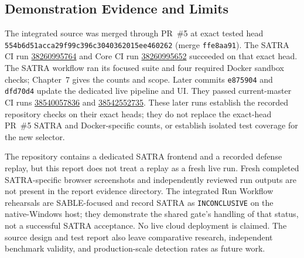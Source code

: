 \subsection{Demonstration Evidence and Limits}
The integrated source was merged through PR~\#5 at exact tested head \texttt{554b6d51ac\allowbreak{}ca29f99c39\allowbreak{}6c30403620\allowbreak{}15ee460262} (merge \texttt{ffe8aa91}). The SATRA CI run \href{https://github.com/SheharyarAli-Dev/Working-POC/actions/runs/38260995764}{38260995764} and Core CI run \href{https://github.com/SheharyarAli-Dev/Working-POC/actions/runs/38260995652}{38260995652} succeeded on that exact head. The SATRA workflow ran its focused suite and four required Docker sandbox checks; Chapter~7 gives the counts and scope. Later commits \texttt{e875904} and \texttt{dfd70d4} update the dedicated live pipeline and UI. They passed current-master CI runs \href{https://github.com/SheharyarAli-Dev/Working-POC/actions/runs/38540057836}{38540057836} and \href{https://github.com/SheharyarAli-Dev/Working-POC/actions/runs/38542552735}{38542552735}. These later runs establish the recorded repository checks on their exact heads; they do not replace the exact-head PR~\#5 SATRA and Docker-specific counts, or establish isolated test coverage for the new selector.

The repository contains a dedicated SATRA frontend and a recorded defense replay, but this report does not treat a replay as a fresh live run. Fresh completed SATRA-specific browser screenshots and independently reviewed run outputs are not present in the report evidence directory. The integrated Run Workflow rehearsals are SABLE-focused and record SATRA as \texttt{INCONCLUSIVE} on the native-Windows host; they demonstrate the shared gate's handling of that status, not a successful SATRA acceptance. No live cloud deployment is claimed. The source design and test report also leave comparative research, independent benchmark validity, and production-scale detection rates as future work.
